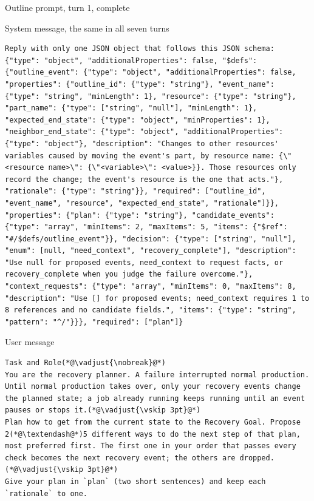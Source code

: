 \documentclass[preprint,12pt,authoryear]{elsarticle}
\newcommand{\who}[1]{{\normalfont\bfseries\fontsize{9}{11}\selectfont\rule{0pt}{2.6ex}#1}}
\begin{document}
{\label{tab:fullprompt}}
\nopagebreak
\begin{fullbox}{Outline prompt, turn 1, complete}
{\who{System message, the same in all seven turns}\par}
\begin{lstlisting}
Reply with only one JSON object that follows this JSON schema:
{"type": "object", "additionalProperties": false, "$defs": {"outline_event": {"type": "object", "additionalProperties": false, "properties": {"outline_id": {"type": "string"}, "event_name": {"type": "string", "minLength": 1}, "resource": {"type": "string"}, "part_name": {"type": ["string", "null"], "minLength": 1}, "expected_end_state": {"type": "object", "minProperties": 1}, "neighbor_end_state": {"type": "object", "additionalProperties": {"type": "object"}, "description": "Changes to other resources' variables caused by moving the event's part, by resource name: {\"<resource name>\": {\"<variable>\": <value>}}. Those resources only record the change; the event's resource is the one that acts."}, "rationale": {"type": "string"}}, "required": ["outline_id", "event_name", "resource", "expected_end_state", "rationale"]}}, "properties": {"plan": {"type": "string"}, "candidate_events": {"type": "array", "minItems": 2, "maxItems": 5, "items": {"$ref": "#/$defs/outline_event"}}, "decision": {"type": ["string", "null"], "enum": [null, "need_context", "recovery_complete"], "description": "Use null for proposed events, need_context to request facts, or recovery_complete when you judge the failure overcome."}, "context_requests": {"type": "array", "minItems": 0, "maxItems": 8, "description": "Use [] for proposed events; need_context requires 1 to 8 references and no candidate fields.", "items": {"type": "string", "pattern": "^/"}}}, "required": ["plan"]}
\end{lstlisting}
\vspace{5pt}
{\who{User message}\par}
\begin{lstlisting}[showlines=true]
Task and Role(*@\vadjust{\nobreak}@*)
You are the recovery planner. A failure interrupted normal production. Until normal production takes over, only your recovery events change the planned state; a job already running keeps running until an event pauses or stops it.(*@\vadjust{\vskip 3pt}@*)
Plan how to get from the current state to the Recovery Goal. Propose 2(*@\textendash@*)5 different ways to do the next step of that plan, most preferred first. The first one in your order that passes every check becomes the next recovery event; the others are dropped.(*@\vadjust{\vskip 3pt}@*)
Give your plan in `plan` (two short sentences) and keep each `rationale` to one.


\end{lstlisting}
\end{fullbox}
\end{document}

